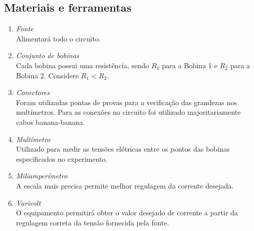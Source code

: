 \documentclass[a4paper,12pt,oneside,openany,table,xcdraw]{article}
\begin{document}
\subsection{Materiais e ferramentas} %
\begin{enumerate}[1 - ]
\item \emph{Fonte}\\
Alimentará todo o circuito.

\item \emph{Conjunto de bobinas}\\
Cada bobina possui uma resistência, sendo $R_1$ para a Bobina 1 e $R_2$ para a Bobina 2. Considere $R_1<R_2$.

\item \emph{Conectores}\\
Foram utilizadas pontas de provas para a verificação das grandezas nos multímetros. Para as conexões no circuito foi utilizado majoritariamente cabos banana-banana.

\item \emph{Multímetro}\\
Utilizado para medir as tensões elétricas entre os pontos das bobinas especificados no experimento.

\item \emph{Miliamperímetro}\\
A escala mais precisa permite melhor regulagem da corrente desejada.

\item \emph{Varivolt}\\
O equipamento permitirá obter o valor desejado de corrente a partir da regulagem correta da tensão fornecida pela fonte.


\end{enumerate}
\end{document}
